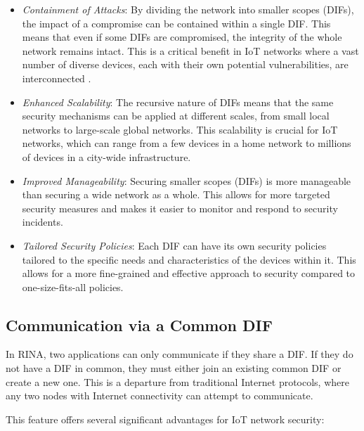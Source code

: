 \documentclass{ieeeaccess}
\begin{document}
\begin{itemize}
	\item \textit{Containment of Attacks}: By dividing the network into smaller scopes (DIFs), the impact of a compromise can be contained within a single DIF. This means that even if some DIFs are compromised, the integrity of the whole network remains intact. This is a critical benefit in IoT networks where a vast number of diverse devices, each with their own potential vulnerabilities, are interconnected \cite{day2008networking}.
	\item \textit{Enhanced Scalability}: The recursive nature of DIFs means that the same security mechanisms can be applied at different scales, from small local networks to large-scale global networks. This scalability is crucial for IoT networks, which can range from a few devices in a home network to millions of devices in a city-wide infrastructure.
	\item \textit{Improved Manageability}: Securing smaller scopes (DIFs) is more manageable than securing a wide network as a whole. This allows for more targeted security measures and makes it easier to monitor and respond to security incidents.
	\item \textit{Tailored Security Policies}: Each DIF can have its own security policies tailored to the specific needs and characteristics of the devices within it. This allows for a more fine-grained and effective approach to security compared to one-size-fits-all policies.
\end{itemize}

\subsection{Communication via a Common DIF}

In RINA, two applications can only communicate if they share a DIF. If they do not have a DIF in common, they must either join an existing common DIF or create a new one. This is a departure from traditional Internet protocols, where any two nodes with Internet connectivity can attempt to communicate.

This feature offers several significant advantages for IoT network security:
\end{document}
